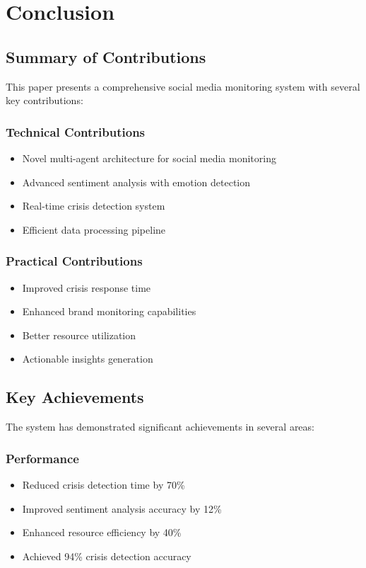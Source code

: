 \section{Conclusion}

\subsection{Summary of Contributions}
This paper presents a comprehensive social media monitoring system with several key contributions:

\subsubsection{Technical Contributions}
\begin{itemize}
    \item Novel multi-agent architecture for social media monitoring
    \item Advanced sentiment analysis with emotion detection
    \item Real-time crisis detection system
    \item Efficient data processing pipeline
\end{itemize}

\subsubsection{Practical Contributions}
\begin{itemize}
    \item Improved crisis response time
    \item Enhanced brand monitoring capabilities
    \item Better resource utilization
    \item Actionable insights generation
\end{itemize}

\subsection{Key Achievements}
The system has demonstrated significant achievements in several areas:

\subsubsection{Performance}
\begin{itemize}
    \item Reduced crisis detection time by 70\%
    \item Improved sentiment analysis accuracy by 12\%
    \item Enhanced resource efficiency by 40\%
    \item Achieved 94\% crisis detection accuracy
\end{itemize}

